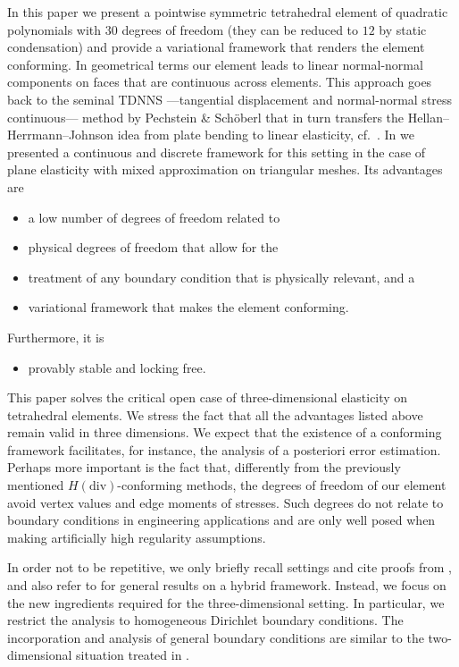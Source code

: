 \documentclass[11pt]{article}
\begin{document}
In this paper we present a pointwise symmetric tetrahedral element of quadratic
polynomials with $30$ degrees of freedom (they can be reduced to $12$ by static condensation)
and provide a variational framework that renders the element conforming.
In geometrical terms our element leads to linear normal-normal components on faces
that are continuous across elements. This approach goes back to the seminal TDNNS
---tangential displacement and normal-normal stress continuous---
method by Pechstein \& Sch\"oberl
\cite{PechsteinS_11_TDN,PechsteinS_12_AMF,PechsteinS_18_ATM} that in turn
transfers the Hellan--Herrmann--Johnson idea from plate bending to linear elasticity,
cf.~\cite{Hellan_67_AEP,Herrmann_67_FEB,Johnson_73_CMF}.
In \cite{CarstensenH_NNC} we presented a continuous and discrete framework
for this setting in the case of plane elasticity with mixed approximation on triangular
meshes. Its advantages are 

\begin{itemize} \setlength\itemsep{0em}
\item a low number of degrees of freedom related to
\item physical degrees of freedom that allow for the
\item treatment of any boundary condition that is physically relevant, and a
\item variational framework that makes the element conforming.
\end{itemize}
Furthermore, it is
\begin{itemize} \setlength\itemsep{0em}
\item provably stable and locking free.
\end{itemize}

This paper solves the critical open case of three-dimensional elasticity
on tetrahedral elements. We stress the fact that all the advantages listed above remain
valid in three dimensions. We expect that the existence of a conforming
framework facilitates, for instance, the analysis of a posteriori error estimation.
Perhaps more important is the fact that, differently from the previously mentioned
$H(\mathrm{div})$-conforming methods, the degrees of freedom of our element avoid
vertex values and edge moments of stresses. Such degrees do not relate to
boundary conditions in engineering applications and are only well posed
when making artificially high regularity assumptions.

In order not to be repetitive, we only briefly recall settings and cite proofs from
\cite{CarstensenH_NNC}, and also refer to \cite{Heuer_GMP} for general results
on a hybrid framework. Instead, we focus on the new ingredients required
for the three-dimensional setting. In particular, we restrict the analysis to
homogeneous Dirichlet boundary conditions.
The incorporation and analysis of general boundary conditions are similar
to the two-dimensional situation treated in \cite{CarstensenH_NNC}.
\end{document}

